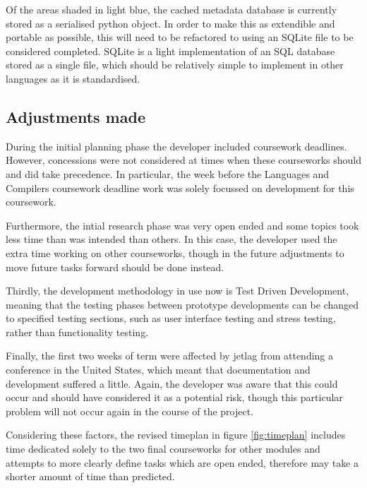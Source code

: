 Of the areas shaded in light blue, the cached metadata database is currently stored as a serialised python object. In order to make this as extendible and portable as possible, this will need to be refactored to using an SQLite file to be considered completed. SQLite is a light implementation of an SQL database stored as a single file, which should be relatively simple to implement in other languages as it is standardised.
\subsection{Adjustments made}
During the initial planning phase the developer included coursework deadlines. However, concessions were not considered at times when these courseworks should and did take precedence. In particular, the week before the Languages and Compilers coursework deadline work was solely focussed on development for this coursework.

Furthermore, the intial research phase was very open ended and some topics took less time than was intended than others. In this case, the developer used the extra time working on other courseworks, though in the future adjustments to move future tasks forward should be done instead.

Thirdly, the development methodology in use now is Test Driven Development, meaning that the testing phases between prototype developments can be changed to specified testing sections, such as user interface testing and stress testing, rather than functionality testing.

Finally, the first two weeks of term were affected by jetlag from attending a conference in the United States, which meant that documentation and development suffered a little. Again, the developer was aware that this could occur and should have considered it as a potential risk, though this particular problem will not occur again in the course of the project.

Considering these factors, the revised timeplan in figure \ref{fig:timeplan} includes time dedicated solely to the two final courseworks for other modules and attempts to more clearly define tasks which are open ended, therefore may take a shorter amount of time than predicted.

